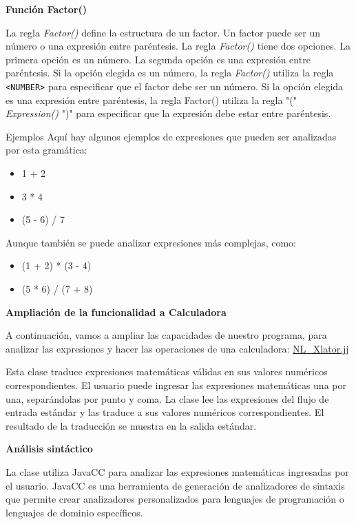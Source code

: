 \textbf{Función Factor()}
\lstset{inputencoding=utf8/latin1}

La regla \textit{Factor()} define la estructura de un factor. Un factor puede ser un número o una expresión entre paréntesis. La regla \textit{Factor()} tiene dos opciones. La primera opción es un número. La segunda opción es una expresión entre paréntesis. Si la opción elegida es un número, la regla \textit{Factor()} utiliza la regla \lstinline|<NUMBER>| para especificar que el factor debe ser un número. Si la opción elegida es una expresión entre paréntesis, la regla Factor() utiliza la regla "(" \textit{Expression()} ")" para especificar que la expresión debe estar entre paréntesis.

Ejemplos
Aquí hay algunos ejemplos de expresiones que pueden ser analizadas por esta gramática:

\begin{itemize}
	\item 1 + 2
	\item 3 * 4
	\item (5 - 6) / 7
\end{itemize}

Aunque también se puede analizar expresiones más complejas, como:
\begin{itemize}
	\item (1 + 2) * (3 - 4)
	\item (5 * 6) / (7 + 8)
\end{itemize}

\textbf{Ampliación de la funcionalidad a Calculadora}

A continuación, vamos a ampliar las capacidades de nuestro programa, para analizar las expresiones y hacer las operaciones de una calculadora: \hyperref[sec:nlxlator]{NL\_Xlator.jj}

%

Esta clase traduce expresiones matemáticas válidas en sus valores numéricos correspondientes. El usuario puede ingresar las expresiones matemáticas una por una, separándolas por punto y coma. La clase lee las expresiones del flujo de entrada estándar y las traduce a sus valores numéricos correspondientes. El resultado de la traducción se muestra en la salida estándar.

\textbf{Análisis sintáctico}

La clase utiliza JavaCC para analizar las expresiones matemáticas ingresadas por el usuario. JavaCC es una herramienta de generación de analizadores de sintaxis que permite crear analizadores personalizados para lenguajes de programación o lenguajes de dominio específicos.

